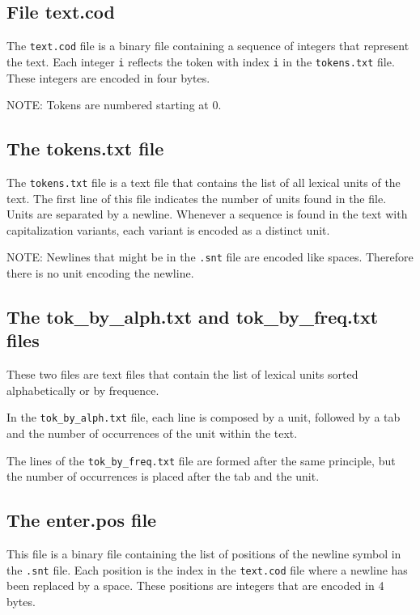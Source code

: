 \subsection{File text.cod}
The \verb+text.cod+ file is a binary file containing a sequence of integers that
represent the text. Each integer \verb+i+ reflects the token with index \verb+i+
in the \verb+tokens.txt+ file. These integers are encoded in four bytes.

\bigskip
\noindent NOTE: Tokens are numbered starting at 0.

\subsection{The tokens.txt file}
The \verb+tokens.txt+ file is a text file that contains the list of all lexical
units of the text. The first line of this file indicates the number of units
found in the file. Units are separated by a newline. Whenever a sequence is found
in the text with capitalization variants, each variant is encoded as a distinct
unit.

\bigskip
\noindent NOTE: Newlines that might be in the \verb+.snt+ file are encoded like
spaces. Therefore there is no unit encoding the newline.

\subsection{The tok\_by\_alph.txt and tok\_by\_freq.txt files}
These two files are text files that contain the list of lexical units sorted
alphabetically or by frequence.

\bigskip
\noindent In the \verb+tok_by_alph.txt+ file, each line is composed by a unit, followed by
a tab and the number of occurrences of the unit within the text.

\bigskip
\noindent The lines of the \verb+tok_by_freq.txt+ file are formed after the same principle,
but the number of occurrences is placed after the tab and the unit.


\subsection{The enter.pos file}
This file is a binary file containing the list of positions of the newline symbol
in the \verb+.snt+ file. Each position is the index in the \verb+text.cod+ file
where a newline has been replaced by a space. These positions are integers that
are encoded in 4 bytes.




